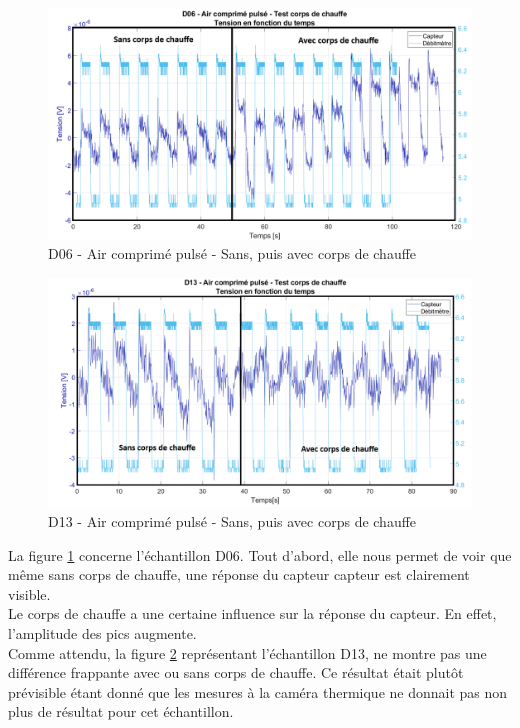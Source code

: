 \begin{figure}[H]
    \centering
    \includegraphics[scale = 0.51]{assets/figures/D06_air_pulse_test_cdc.png}
    \caption{D06 - Air comprimé pulsé - Sans, puis avec corps de chauffe}
    \label{fig:d06_test_cdc}
\end{figure}

\begin{figure}[H]
    \centering
    \includegraphics[scale = 0.5]{assets/figures/D13_air_comprime_pulse_test_cdc.png}
    \caption{D13 - Air comprimé pulsé - Sans, puis avec corps de chauffe}
    \label{fig:d13_test_cdc}
\end{figure}

La figure \ref{fig:d06_test_cdc} concerne l'échantillon D06. Tout d'abord, elle nous permet de voir que même sans corps de chauffe, une réponse 
du capteur \gls{capteur} est clairement visible. \\
Le corps de chauffe a une certaine influence sur la réponse du capteur. En effet, l'amplitude des pics augmente. \\
Comme attendu, la figure \ref{fig:d13_test_cdc} représentant l'échantillon D13, ne montre pas une différence frappante avec ou sans corps de 
chauffe. Ce résultat était plutôt prévisible étant donné que les mesures à la caméra thermique ne donnait pas non plus de résultat pour cet 
échantillon. \\


